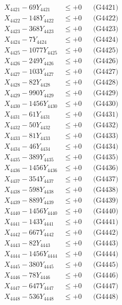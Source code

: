 \documentclass[a4paper,10pt]{article}
\begin{document}
{\begin{align}
\allowbreak
X_{4421} - 69Y_{4421} &\leq +0 && \text{(G4421)} \\
X_{4422} - 148Y_{4422} &\leq +0 && \text{(G4422)} \\
X_{4423} - 368Y_{4423} &\leq +0 && \text{(G4423)} \\
X_{4424} - 7Y_{4424} &\leq +0 && \text{(G4424)} \\
X_{4425} - 1077Y_{4425} &\leq +0 && \text{(G4425)} \\
X_{4426} - 249Y_{4426} &\leq +0 && \text{(G4426)} \\
X_{4427} - 103Y_{4427} &\leq +0 && \text{(G4427)} \\
X_{4428} - 82Y_{4428} &\leq +0 && \text{(G4428)} \\
X_{4429} - 990Y_{4429} &\leq +0 && \text{(G4429)} \\
X_{4430} - 1456Y_{4430} &\leq +0 && \text{(G4430)} \\
\allowbreak
X_{4431} - 61Y_{4431} &\leq +0 && \text{(G4431)} \\
X_{4432} - 50Y_{4432} &\leq +0 && \text{(G4432)} \\
X_{4433} - 81Y_{4433} &\leq +0 && \text{(G4433)} \\
X_{4434} - 46Y_{4434} &\leq +0 && \text{(G4434)} \\
X_{4435} - 389Y_{4435} &\leq +0 && \text{(G4435)} \\
X_{4436} - 1456Y_{4436} &\leq +0 && \text{(G4436)} \\
X_{4437} - 354Y_{4437} &\leq +0 && \text{(G4437)} \\
X_{4438} - 598Y_{4438} &\leq +0 && \text{(G4438)} \\
X_{4439} - 889Y_{4439} &\leq +0 && \text{(G4439)} \\
X_{4440} - 1456Y_{4440} &\leq +0 && \text{(G4440)} \\
\allowbreak
X_{4441} - 143Y_{4441} &\leq +0 && \text{(G4441)} \\
X_{4442} - 667Y_{4442} &\leq +0 && \text{(G4442)} \\
X_{4443} - 82Y_{4443} &\leq +0 && \text{(G4443)} \\
X_{4444} - 1456Y_{4444} &\leq +0 && \text{(G4444)} \\
X_{4445} - 380Y_{4445} &\leq +0 && \text{(G4445)} \\
X_{4446} - 78Y_{4446} &\leq +0 && \text{(G4446)} \\
X_{4447} - 647Y_{4447} &\leq +0 && \text{(G4447)} \\
X_{4448} - 536Y_{4448} &\leq +0 && \text{(G4448)} \\

\end{align}}
\end{document}
